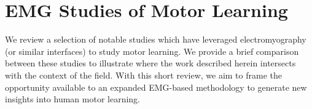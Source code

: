 \documentclass[../main.tex]{subfiles}
\begin{document}
\section{EMG Studies of Motor Learning}









We review a selection of notable studies which have leveraged electromyography (or similar interfaces) to study motor learning. We provide a brief comparison between these studies to illustrate where the work described herein intersects with the context of the field. With this short review, we aim to frame the opportunity available to an expanded EMG-based methodology to generate new insights into human motor learning.
\end{document}
